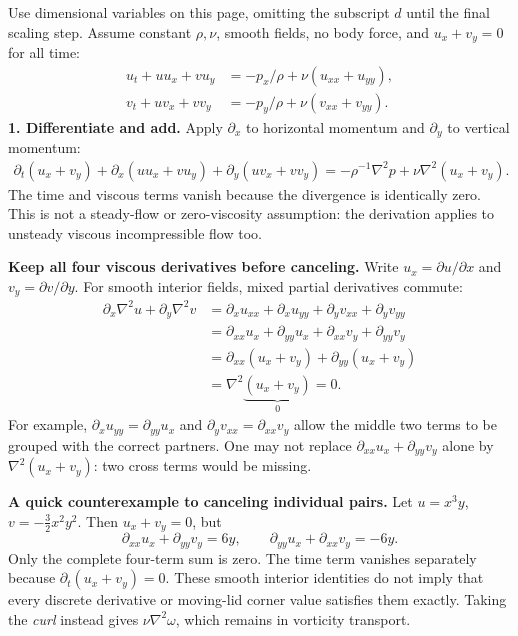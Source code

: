 \label{sec:pressure-proof}
Use dimensional variables on this page, omitting the subscript $d$ until the final scaling step. Assume constant $\rho,\nu$, smooth fields, no body force, and $u_x+v_y=0$ for all time:
\begin{align*}
u_t+uu_x+vu_y&=-p_x/\rho+\nu(u_{xx}+u_{yy}),\\
v_t+uv_x+vv_y&=-p_y/\rho+\nu(v_{xx}+v_{yy}).
\end{align*}
\textbf{1. Differentiate and add.} Apply $\partial_x$ to horizontal momentum and $\partial_y$ to vertical momentum:
\begin{align*}
\partial_t(u_x+v_y)+\partial_x(uu_x+vu_y)+\partial_y(uv_x+vv_y)
=-\rho^{-1}\nabla^2p+\nu\nabla^2(u_x+v_y).
\end{align*}
The time and viscous terms vanish because the divergence is identically zero. This is not a steady-flow or zero-viscosity assumption: the derivation applies to unsteady viscous incompressible flow too.

\textbf{Keep all four viscous derivatives before canceling.} Write $u_x=\partial u/\partial x$ and $v_y=\partial v/\partial y$. For smooth interior fields, mixed partial derivatives commute:
\begin{align*}
\partial_x\nabla^2u+\partial_y\nabla^2v
&=\partial_xu_{xx}+\partial_xu_{yy}
 +\partial_yv_{xx}+\partial_yv_{yy}\\
&=\partial_{xx}u_x+\partial_{yy}u_x
 +\partial_{xx}v_y+\partial_{yy}v_y\\
&=\partial_{xx}(u_x+v_y)+\partial_{yy}(u_x+v_y)\\
&=\nabla^2\underbrace{(u_x+v_y)}_{0}=0.
\end{align*}
For example, $\partial_xu_{yy}=\partial_{yy}u_x$ and $\partial_yv_{xx}=\partial_{xx}v_y$ allow the middle two terms to be grouped with the correct partners. One may not replace $\partial_{xx}u_x+\partial_{yy}v_y$ alone by $\nabla^2(u_x+v_y)$: two cross terms would be missing.

\textbf{A quick counterexample to canceling individual pairs.} Let $u=x^3y$, $v=-\tfrac32x^2y^2$. Then $u_x+v_y=0$, but
\[
\partial_{xx}u_x+\partial_{yy}v_y=6y,\qquad
\partial_{yy}u_x+\partial_{xx}v_y=-6y.
\]
Only the complete four-term sum is zero. The time term vanishes separately because $\partial_t(u_x+v_y)=0$. These smooth interior identities do not imply that every discrete derivative or moving-lid corner value satisfies them exactly. Taking the \emph{curl} instead gives $\nu\nabla^2\omega$, which remains in vorticity transport.
\newpage

